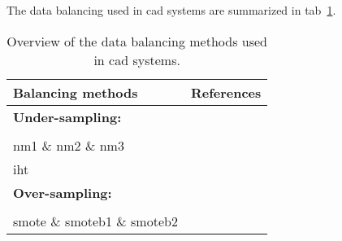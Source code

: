 The data balancing used in \ac{cad} systems are summarized in
\acs{tab}~\ref{tab:databal}.

\begin{table}
  \caption{Overview of the data balancing methods used in \acs*{cad} systems.}
  \centering
  \begin{tabular}{l r}
    \toprule
    \textbf{Balancing methods} & \textbf{References} \\
    \midrule
    \textbf{Under-sampling:} & \\ \\ [-1.5ex]
    \quad \Acl*{nm1} \& \Acl*{nm2} \& \Acl*{nm3} & \cite{Lemaitre2016thesis} \\
    \quad \Acl*{iht} & \cite{Lemaitre2016thesis} \\
    \textbf{Over-sampling:} & \\ \\ [-1.5ex]
    \quad \acs*{smote} \& \acs*{smoteb1} \& \acs*{smoteb2} & \cite{Lemaitre2016thesis} \\
    \bottomrule
  \end{tabular}
  \label{tab:databal}
\end{table}


